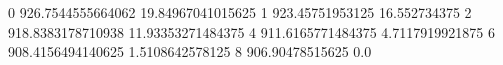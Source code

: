 0 926.7544555664062 19.84967041015625
1 923.45751953125 16.552734375
2 918.8383178710938 11.93353271484375
4 911.6165771484375 4.7117919921875
6 908.4156494140625 1.5108642578125
8 906.90478515625 0.0
